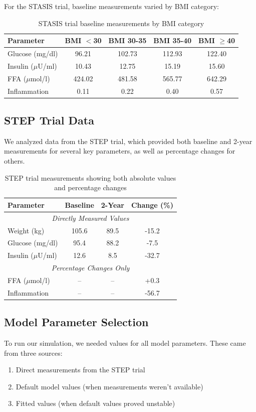For the STASIS trial, baseline measurements varied by BMI category:

\begin{table}[h]
\centering
\begin{tabular}{|l|c|c|c|c|}
\hline
\textbf{Parameter} & \textbf{BMI $<$30} & \textbf{BMI 30-35} & \textbf{BMI 35-40} & \textbf{BMI $\geq$40} \\
\hline
Glucose (mg/dl) & 96.21 & 102.73 & 112.93 & 122.40 \\
Insulin ($\mu$U/ml) & 10.43 & 12.75 & 15.19 & 15.60 \\
FFA ($\mu$mol/l) & 424.02 & 481.58 & 565.77 & 642.29 \\
Inflammation & 0.11 & 0.22 & 0.40 & 0.57 \\
\hline
\end{tabular}
\caption{STASIS trial baseline measurements by BMI category}
\end{table}

\subsection{STEP Trial Data}
We analyzed data from the STEP trial, which provided both baseline and 2-year measurements for several key parameters, as well as percentage changes for others.

\begin{table}[h]
\centering
\begin{tabular}{|l|c|c|c|}
\hline
\textbf{Parameter} & \textbf{Baseline} & \textbf{2-Year} & \textbf{Change (\%)} \\
\hline
\multicolumn{4}{|c|}{\textit{Directly Measured Values}} \\
\hline
Weight (kg) & 105.6 & 89.5 & -15.2 \\
Glucose (mg/dl) & 95.4 & 88.2 & -7.5 \\
Insulin ($\mu$U/ml) & 12.6 & 8.5 & -32.7 \\
\hline
\multicolumn{4}{|c|}{\textit{Percentage Changes Only}} \\
\hline
FFA ($\mu$mol/l) & -- & -- & +0.3 \\
Inflammation & -- & -- & -56.7 \\
\hline
\end{tabular}
\caption{STEP trial measurements showing both absolute values and percentage changes}
\end{table}

\subsection{Model Parameter Selection}
To run our simulation, we needed values for all model parameters. These came from three sources:
\begin{enumerate}
    \item Direct measurements from the STEP trial
    \item Default model values (when measurements weren't available)
    \item Fitted values (when default values proved unstable)
\end{enumerate}

